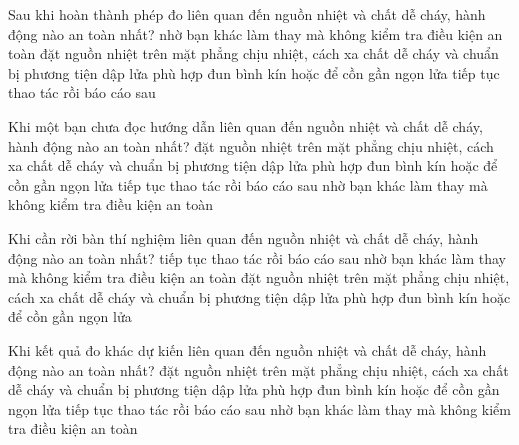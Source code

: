 \begin{ex}
Sau khi hoàn thành phép đo liên quan đến nguồn nhiệt và chất dễ cháy, hành động nào an toàn nhất?
\choice
{nhờ bạn khác làm thay mà không kiểm tra điều kiện an toàn}
{\True đặt nguồn nhiệt trên mặt phẳng chịu nhiệt, cách xa chất dễ cháy và chuẩn bị phương tiện dập lửa phù hợp}
{đun bình kín hoặc để cồn gần ngọn lửa}
{tiếp tục thao tác rồi báo cáo sau}
\end{ex}

\begin{ex}
Khi một bạn chưa đọc hướng dẫn liên quan đến nguồn nhiệt và chất dễ cháy, hành động nào an toàn nhất?
\choice
{\True đặt nguồn nhiệt trên mặt phẳng chịu nhiệt, cách xa chất dễ cháy và chuẩn bị phương tiện dập lửa phù hợp}
{đun bình kín hoặc để cồn gần ngọn lửa}
{tiếp tục thao tác rồi báo cáo sau}
{nhờ bạn khác làm thay mà không kiểm tra điều kiện an toàn}
\end{ex}

\begin{ex}
Khi cần rời bàn thí nghiệm liên quan đến nguồn nhiệt và chất dễ cháy, hành động nào an toàn nhất?
\choice
{tiếp tục thao tác rồi báo cáo sau}
{nhờ bạn khác làm thay mà không kiểm tra điều kiện an toàn}
{\True đặt nguồn nhiệt trên mặt phẳng chịu nhiệt, cách xa chất dễ cháy và chuẩn bị phương tiện dập lửa phù hợp}
{đun bình kín hoặc để cồn gần ngọn lửa}
\end{ex}

\begin{ex}
Khi kết quả đo khác dự kiến liên quan đến nguồn nhiệt và chất dễ cháy, hành động nào an toàn nhất?
\choice
{\True đặt nguồn nhiệt trên mặt phẳng chịu nhiệt, cách xa chất dễ cháy và chuẩn bị phương tiện dập lửa phù hợp}
{đun bình kín hoặc để cồn gần ngọn lửa}
{tiếp tục thao tác rồi báo cáo sau}
{nhờ bạn khác làm thay mà không kiểm tra điều kiện an toàn}
\end{ex}

